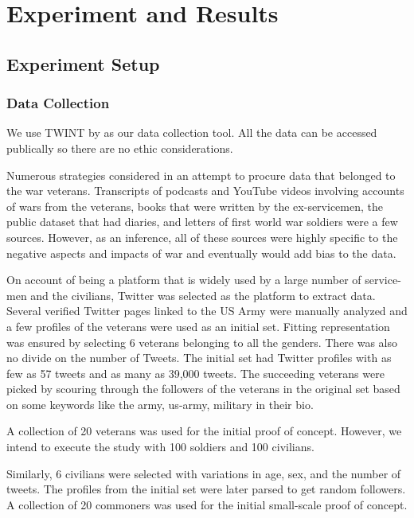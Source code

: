 \section{Experiment and Results}

\subsection{Experiment Setup}

\subsubsection{Data Collection}

We use TWINT by \cite{twint} as our data collection tool.
All the data can be accessed publically so there are no ethic considerations.

Numerous strategies considered in an attempt to procure data that belonged to
the war veterans. Transcripts of podcasts and YouTube videos involving accounts
of wars from the veterans, books that were written by the ex-servicemen, the
public dataset that had diaries, and letters of first world war soldiers were a
few sources. However, as an inference, all of these sources were highly specific
to the negative aspects and impacts of war and eventually would add bias to the
data.

On account of being a platform that is widely used by a large number of
service-men and the civilians, Twitter was selected as the platform to extract
data. Several verified Twitter pages linked to the US Army were manually analyzed
and a few profiles of the veterans were used as an initial set. Fitting
representation was ensured by selecting 6 veterans belonging to all the genders.
There was also no divide on the number of Tweets. The initial set had Twitter
profiles with as few as 57 tweets and as many as 39,000 tweets. The succeeding
veterans were picked by scouring through the followers of the veterans in the
original set based on some keywords like the army, us-army, military in their
bio.

A collection of 20 veterans was used for the initial proof of concept. However,
we intend to execute the study with 100 soldiers and 100 civilians.

Similarly, 6 civilians were selected with variations in age, sex, and the number
of tweets. The profiles from the initial set were later parsed to get random
followers. A collection of 20 commoners was used for the initial small-scale
proof of concept.

